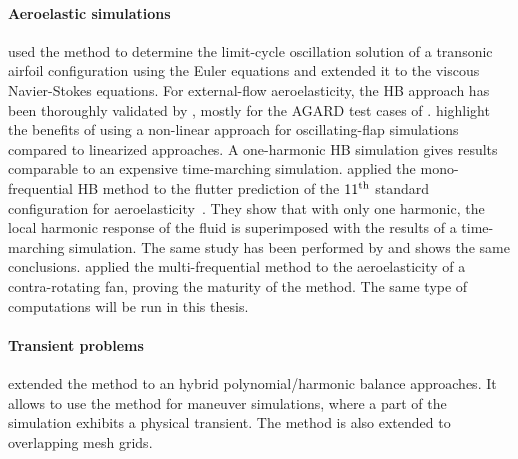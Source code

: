 \paragraph{Aeroelastic simulations}
\citet{Thomas2002a} used the method to
determine the limit-cycle oscillation solution
of a transonic airfoil configuration using the
Euler equations and \citet{Thomas2004b} extended
it to the viscous Navier-Stokes equations.
For external-flow aeroelasticity, the HB approach has 
been thoroughly 
validated by \citet{Gopinath2005, JSicot2008, Woodgate2009, JDufour2009}, 
mostly for the AGARD test cases of \citet{Davis1982}. 
\citet{JDufour2009} highlight the benefits of using a 
non-linear approach for oscillating-flap simulations
compared to linearized approaches. A one-harmonic HB simulation
gives results comparable to an expensive time-marching simulation.
\citet{Huang2013} applied the mono-frequential
HB method to the flutter prediction of the 
$11\textsuperscript{th}$ 
standard configuration for aeroelasticity~\cite{Fransson1999}.
They show that with only one harmonic, the local
harmonic response of the fluid is superimposed
with the results of a time-marching simulation.
The same study has been performed by 
\citet{Jsicot12:_time_domain_harmon_balan_method}
and shows the same conclusions.
\citet{JSicot2013} applied the multi-frequential 
method to the
aeroelasticity of a contra-rotating fan, proving
the maturity of the method. The same type of 
computations will be run in this thesis.


\paragraph{Transient problems}
\citet{Mavriplis2012} extended the method to 
an hybrid polynomial/harmonic balance approaches. 
It allows to use the method for maneuver simulations, 
where a part of the simulation exhibits a physical transient.
The method is also extended to overlapping mesh grids.

